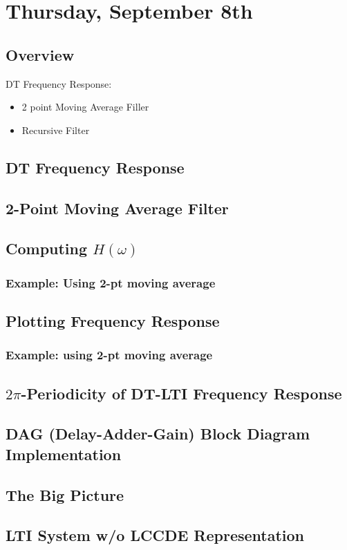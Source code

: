 \section{Thursday, September 8th}
\subsection{Overview}
DT Frequency Response:
\begin{itemize}
    \item 2 point Moving Average Filler
    \item Recursive Filter
\end{itemize}
\subsection{DT Frequency Response}
\subsection{2-Point Moving Average Filter}
\subsection{Computing \texorpdfstring{$H(\omega)$}{H(w)}}
\subsubsection{Example: Using 2-pt moving average}
\subsection{Plotting Frequency Response}
\subsubsection{Example: using 2-pt moving average}
\subsection{\texorpdfstring{$2\pi$}{2pi}-Periodicity of DT-LTI Frequency Response}
\subsection{DAG (Delay-Adder-Gain) Block Diagram Implementation}
\subsection{The Big Picture}
\subsection{LTI System w/o LCCDE Representation}
